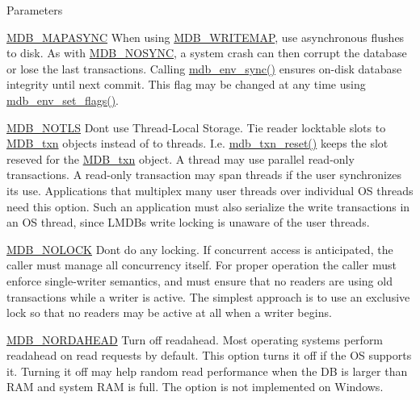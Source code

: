 \begin{DoxyParams}[1]{Parameters}
\begin{DoxyItemize}
\item \mbox{\hyperlink{group__mdb__env_gab034ed0d8e5938090aef5ee0997f7e94}{M\+D\+B\+\_\+\+M\+A\+P\+A\+S\+Y\+NC}} When using \mbox{\hyperlink{group__mdb__env_ga7b81e9fd5f8fae38786d67e1a8387fa7}{M\+D\+B\+\_\+\+W\+R\+I\+T\+E\+M\+AP}}, use asynchronous flushes to disk. As with \mbox{\hyperlink{group__mdb__env_ga5791dd1adb09123f82dd1f331209e12e}{M\+D\+B\+\_\+\+N\+O\+S\+Y\+NC}}, a system crash can then corrupt the database or lose the last transactions. Calling \mbox{\hyperlink{group__mdb_ga85e61f05aa68b520cc6c3b981dba5037}{mdb\+\_\+env\+\_\+sync()}} ensures on-\/disk database integrity until next commit. This flag may be changed at any time using \mbox{\hyperlink{group__mdb_ga83f66cf02bfd42119451e9468dc58445}{mdb\+\_\+env\+\_\+set\+\_\+flags()}}. 
\item \mbox{\hyperlink{group__mdb__env_ga5dca84a576d14b4bfe2deddc2dc622d3}{M\+D\+B\+\_\+\+N\+O\+T\+LS}} Don\textquotesingle{}t use Thread-\/\+Local Storage. Tie reader locktable slots to \mbox{\hyperlink{struct_m_d_b__txn}{M\+D\+B\+\_\+txn}} objects instead of to threads. I.\+e. \mbox{\hyperlink{group__mdb_ga02b06706f8a66249769503c4e88c56cd}{mdb\+\_\+txn\+\_\+reset()}} keeps the slot reseved for the \mbox{\hyperlink{struct_m_d_b__txn}{M\+D\+B\+\_\+txn}} object. A thread may use parallel read-\/only transactions. A read-\/only transaction may span threads if the user synchronizes its use. Applications that multiplex many user threads over individual OS threads need this option. Such an application must also serialize the write transactions in an OS thread, since L\+M\+DB\textquotesingle{}s write locking is unaware of the user threads. 
\item \mbox{\hyperlink{group__mdb__env_ga9b0450b1a87cb9f22e033550e49e5037}{M\+D\+B\+\_\+\+N\+O\+L\+O\+CK}} Don\textquotesingle{}t do any locking. If concurrent access is anticipated, the caller must manage all concurrency itself. For proper operation the caller must enforce single-\/writer semantics, and must ensure that no readers are using old transactions while a writer is active. The simplest approach is to use an exclusive lock so that no readers may be active at all when a writer begins. 
\item \mbox{\hyperlink{group__mdb__env_ga0fcdaf42f0c45749a2dff11ee322303f}{M\+D\+B\+\_\+\+N\+O\+R\+D\+A\+H\+E\+AD}} Turn off readahead. Most operating systems perform readahead on read requests by default. This option turns it off if the OS supports it. Turning it off may help random read performance when the DB is larger than R\+AM and system R\+AM is full. The option is not implemented on Windows. 

\end{DoxyItemize}
\end{DoxyParams}
